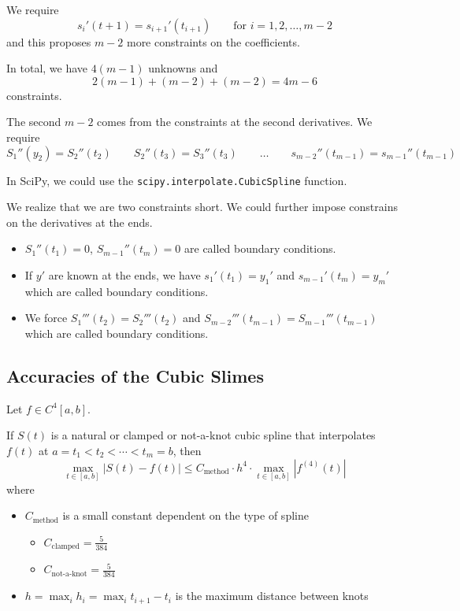 \begin{example}
\begin{itemize}
              We require \[
                  s_i'(t + 1) = s_{i+1}'(t_{i+1}) \qquad \text{for } i = 1, 2, \ldots, m-2
              \] and this proposes \( m - 2 \) more constraints on the coefficients.
    \end{itemize}

    In total, we have \( 4(m - 1) \) unknowns and \[
        2(m-1) + (m-2) + (m-2) = 4m - 6
    \] constraints.

    The second \( m-2 \) comes from the constraints at the second derivatives. We require \[
        S_1''(y_2) = S_2''(t_2) \qquad S_2''(t_3) = S_3''(t_3) \qquad \dots \qquad s_{m-2}''(t_{m-1}) = s_{m-1}''(t_{m-1})
    \]
\end{example}

\begin{remark}
    In SciPy, we could use the \texttt{scipy.interpolate.CubicSpline} function.
\end{remark}

We realize that we are two constraints short. We could further impose constrains on the derivatives at the ends.

\begin{itemize}
    \item \( S_1''(t_1) = 0 \), \( S_{m-1}''(t_m) = 0 \) are called  boundary conditions.
    \item If \( y' \) are known at the ends, we have \( s_1'(t_1) = y_1' \) and \( s_{m-1}'(t_m) = y_m' \) which are called  boundary conditions.
    \item We force \( S_1'''(t_2) = S_2'''(t_2) \) and \( S_{m-2}'''(t_{m-1}) = S_{m-1}'''(t_{m-1}) \) which are called  boundary conditions.
\end{itemize}

\subsection{Accuracies of the Cubic Slimes}

\begin{theorem}
    Let \( f \in C^4[a, b] \).

    If \( S(t) \) is a natural or clamped or not-a-knot cubic spline that interpolates \( f(t) \) at \( a = t_1 < t_2 < \cdots < t_m = b \), then \[
        \max_{t \in [a, b]} | S(t) - f(t) | \leq C_{\text{method}} \cdot h^4 \cdot \max_{t \in [a, b]} | f^{(4)}(t) |
    \] where
    \begin{itemize}
        \item \( C_{\text{method}} \) is a small constant dependent on the type of spline
              \begin{itemize}
                  \item \( C_{\text{clamped}} = \frac{5}{384} \)
                  \item \( C_{\text{not-a-knot}} = \frac{5}{384} \)
              \end{itemize}
        \item \( h = \max_{i} h_i = \max_{i} t_{i+1}-t_i \) is the maximum distance between knots
    \end{itemize}
\end{theorem}

